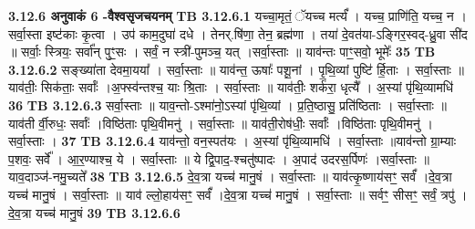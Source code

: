 \documentclass[17pt]{extarticle}
\begin{document}
{{{{{{{{{{{{{{{{{{{{{{{                \textbf{ 3.12.6    अनुवाकं   6 -वैश्वसृजचयनम्} \newline
                                \textbf{ TB 3.12.6.1} \newline
                  यच्चा॒मृतं॒ ॅयच्च मर्त्यं᳚ । यच्च॒ प्राणि॑ति॒ यच्च॒ न । सर्वा॒स्ता इष्ट॑काः कृ॒त्वा । उप॑ काम॒दुघा॑ दधे । तेनर्.षि॑णा॒ तेन॒ ब्रह्म॑णा । तया॑ दे॒वत॑या-ऽङ्गिर॒स्वद्-ध्रु॒वा सी॑द ॥ सर्वाः॒ स्त्रियः॒ सर्वा᳚न् पुꣳ॒॒सः । सर्वं॒ न स्त्री॑-पुमञ्च॒ यत् ।सर्वा॒स्ताः ॥ याव॑न्तः पाꣳ॒॒सवो॒ भूमेः᳚ \textbf{ 35} \newline
                  \newline
                                \textbf{ TB 3.12.6.2} \newline
                  सङ्ख्या॑ता देवमा॒यया᳚ । सर्वा॒स्ताः ॥ याव॑न्त॒ ऊषाः᳚ पशू॒नां । पृ॒थि॒व्यां पुष्टि॑ र्हि॒ताः । सर्वा॒स्ताः ॥ याव॑तीः॒ सिक॑ताः॒ सर्वाः᳚ ।अ॒फ्स्व॑न्तश्च॒ याः श्रि॒ताः । सर्वा॒स्ताः ॥ याव॑तीः॒ शर्क॑रा॒ धृत्यै᳚ । अ॒स्यां पृ॑थि॒व्यामधि॑ \textbf{ 36} \newline
                  \newline
                                \textbf{ TB 3.12.6.3} \newline
                  सर्वा॒स्ताः ॥ याव॒न्तो-ऽश्मा॑नो॒ऽस्यां पृ॑थि॒व्यां । प्र॒ति॒ष्ठासु॒ प्रति॑ष्ठिताः । सर्वा॒स्ताः ॥ याव॑ती र्वी॒रुधः॒ सर्वाः᳚ ।विष्ठि॑ताः पृथि॒वीमनु॑ । सर्वा॒स्ताः ॥ याव॑ती॒रोष॑धीः॒ सर्वाः᳚ ।विष्ठि॑ताः पृथि॒वीमनु॑ । सर्वा॒स्ताः । \textbf{ 37} \newline
                  \newline
                                \textbf{ TB 3.12.6.4} \newline
                  याव॑न्तो॒ वन॒स्पत॑यः । अ॒स्यां पृ॑थि॒व्यामधि॑ । सर्वा॒स्ताः ॥याव॑न्तो ग्रा॒म्याः प॒शवः॒ सर्वे᳚ । आ॒र॒ण्याश्च॒ ये । सर्वा॒स्ताः ॥ ये द्वि॒पाद॒-श्चतु॑ष्पादः । अ॒पाद॑ उदरस॒र्पिणः॑ ।सर्वा॒स्ताः ॥ याव॒दाञ्ज॑-नमु॒च्यते᳚ \textbf{ 38} \newline
                  \newline
                                \textbf{ TB 3.12.6.5} \newline
                  दे॒व॒त्रा यच्च॑ मानु॒षं । सर्वा॒स्ताः ॥ याव॑त्कृ॒ष्णाय॑सꣳ॒॒ सर्वं᳚ ।दे॒व॒त्रा यच्च॑ मानु॒षं । सर्वा॒स्ताः ॥ याव॑ ल्लो॒हाय॑सꣳ॒॒ सर्वं᳚ ।दे॒व॒त्रा यच्च॑ मानु॒षं । सर्वा॒स्ताः ॥ सर्वꣳ॒॒ सीसꣳ॒॒ सर्वं॒ त्रपु॑ ।दे॒व॒त्रा यच्च॑ मानु॒षं \textbf{ 39} \newline
                  \newline
                                \textbf{ TB 3.12.6.6} \newline
}}}}}}}}}}}}}}}}}}}}}}}
\end{document}
